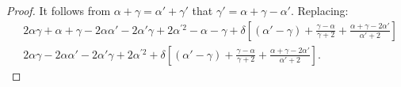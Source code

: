 \documentclass[version=3.21, pagesize, twoside=off, bibliography=totoc, DIV=calc, fontsize=12pt, a4paper]{scrartcl}
\begin{document}
\begin{proof}
	It follows from $\alpha + \gamma = \alpha' + \gamma'$ that $\gamma' = \alpha + \gamma - \alpha'$. Replacing:
	\begin{align}
		& 2 \alpha \gamma + \alpha + \gamma - 2 \alpha \alpha' - 2 \alpha' \gamma + 2 \alpha^{\prime 2} - \alpha - \gamma
			+ \delta [(\alpha' - \gamma) + \frac{\gamma - \alpha}{\gamma + 2} + \frac{\alpha + \gamma - 2 \alpha'}{\alpha' + 2}]\\
		& 2 \alpha \gamma - 2 \alpha \alpha' - 2 \alpha' \gamma + 2 \alpha^{\prime 2}
			+ \delta [(\alpha' - \gamma) + \frac{\gamma - \alpha}{\gamma + 2} + \frac{\alpha + \gamma - 2 \alpha'}{\alpha' + 2}]. %
	\end{align}
	

\end{proof}
\end{document}
